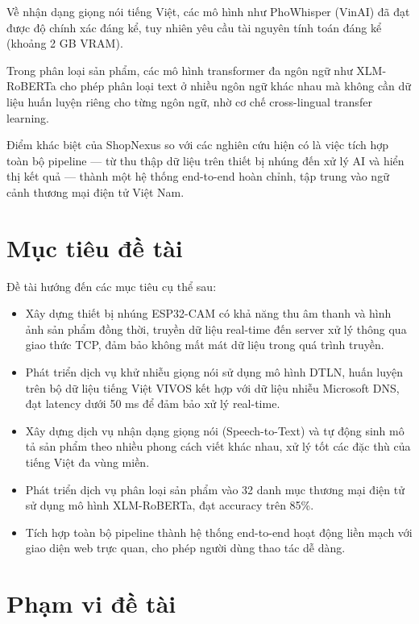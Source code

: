 Về nhận dạng giọng nói tiếng Việt, các mô hình như PhoWhisper (VinAI) đã đạt 
được độ chính xác đáng kể, tuy nhiên yêu cầu tài nguyên tính toán đáng kể (khoảng 2 GB VRAM).

Trong phân loại sản phẩm, các mô hình transformer đa ngôn ngữ như XLM-RoBERTa
cho phép phân loại text ở nhiều ngôn ngữ khác nhau mà không cần dữ liệu huấn
luyện riêng cho từng ngôn ngữ, nhờ cơ chế cross-lingual transfer learning.

Điểm khác biệt của ShopNexus so với các nghiên cứu hiện có là việc tích hợp
toàn bộ pipeline --- từ thu thập dữ liệu trên thiết bị nhúng đến xử lý AI
và hiển thị kết quả --- thành một hệ thống end-to-end hoàn chỉnh, tập trung
vào ngữ cảnh thương mại điện tử Việt Nam.

\section{Mục tiêu đề tài}

Đề tài hướng đến các mục tiêu cụ thể sau:

\begin{itemize}
\item Xây dựng thiết bị nhúng ESP32-CAM có khả năng thu âm thanh và hình ảnh
  sản phẩm đồng thời, truyền dữ liệu real-time đến server xử lý thông qua
  giao thức TCP, đảm bảo không mất mát dữ liệu trong quá trình truyền.
\item Phát triển dịch vụ khử nhiễu giọng nói sử dụng mô hình DTLN,
  huấn luyện trên bộ dữ liệu tiếng Việt VIVOS kết hợp với dữ liệu nhiễu
  Microsoft DNS, đạt latency dưới 50 ms để đảm bảo xử lý real-time.
\item Xây dựng dịch vụ nhận dạng giọng nói (Speech-to-Text) và tự động
  sinh mô tả sản phẩm theo nhiều phong cách viết khác nhau, xử lý tốt
  các đặc thù của tiếng Việt đa vùng miền.
\item Phát triển dịch vụ phân loại sản phẩm vào 32 danh mục thương mại
  điện tử sử dụng mô hình XLM-RoBERTa, đạt accuracy trên 85\%.
\item Tích hợp toàn bộ pipeline thành hệ thống end-to-end hoạt động liền mạch
  với giao diện web trực quan, cho phép người dùng thao tác dễ dàng.
\end{itemize}

\section{Phạm vi đề tài}

